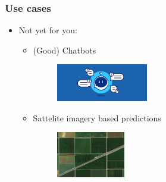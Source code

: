 \begin{frame}\frametitle{Use cases}
   \begin{itemize}
      \item Not yet for you:
      \begin{itemize}
         \item (Good) Chatbots
         \begin{minipage}{0.2\linewidth}
            \begin{figure}[H]
               \includegraphics[width=4cm]{../images/illustrations/chatbot.png}
            \end{figure}
         \end{minipage}
         
         \item Sattelite imagery based predictions
         \begin{minipage}{0.2\linewidth}
            \begin{figure}[H]
               \includegraphics[width=3cm]{../images/illustrations/corn_field.jpeg}
            \end{figure}
         \end{minipage}
         
      \end{itemize}
   \end{itemize}
\end{frame}



